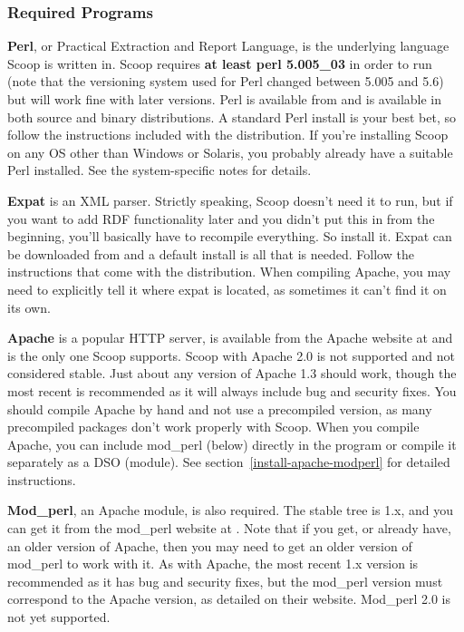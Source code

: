 \subsubsection{Required Programs}
\label{install-require}

{\bf Perl}, or Practical Extraction and Report Language, is the underlying language Scoop is written in. Scoop requires {\bf at least perl 5.005\_03} in order to run (note that the versioning system used for Perl changed between 5.005 and 5.6) but will work fine with later versions.  Perl is available from  and is available in both source and binary distributions.  A standard Perl install is your best bet, so follow the instructions included with the distribution.  If you're installing Scoop on any OS other than Windows or Solaris, you probably already have a suitable Perl installed. See the system-specific notes for details.

{\bf Expat} is an XML parser.  Strictly speaking, Scoop doesn't need it to run, but if you want to add RDF functionality later and you didn't put this in from the beginning, you'll basically have to recompile everything.  So install it.  Expat can be downloaded from  and a default install is all that is needed.  Follow the instructions that come with the distribution.  When compiling Apache, you may need to explicitly tell it where expat is located, as sometimes it can't find it on its own.

{\bf Apache} is a popular HTTP server, is available from the Apache website at  and is the only one Scoop supports. Scoop with Apache 2.0 is not supported and not considered stable. Just about any version of Apache 1.3 should work, though the most recent is recommended as it will always include bug and security fixes.  You should compile Apache by hand and not use a precompiled version, as many precompiled packages don't work properly with Scoop.  When you compile Apache, you can include mod\_perl (below) directly in the program or compile it separately as a DSO (module).  See section~\ref{install-apache-modperl} for detailed instructions.

{\bf Mod\_perl}, an Apache module, is also required. The stable tree is 1.x, and you can get it from the mod\_perl website at . Note that if you get, or already have, an older version of Apache, then you may need to get an older version of mod\_perl to work with it.  As with Apache, the most recent 1.x version is recommended as it has bug and security fixes, but the mod\_perl version must correspond to the Apache version, as detailed on their website.  Mod\_perl 2.0 is not yet supported.

